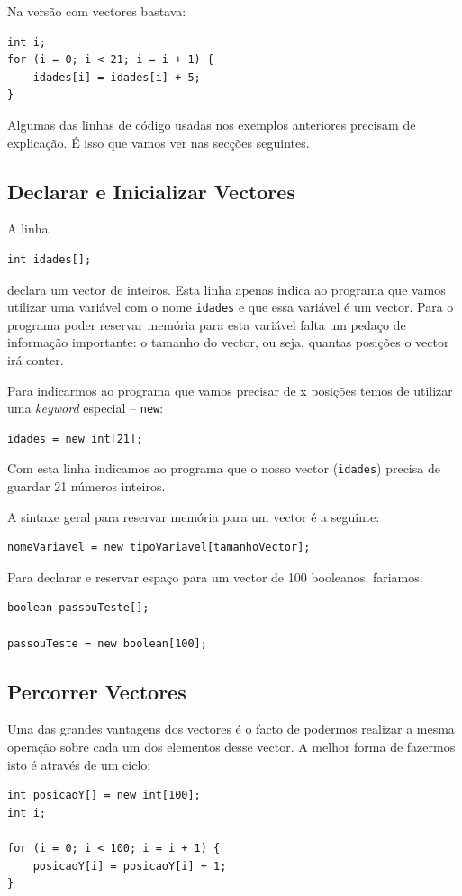 Na versão com vectores bastava:
\begin{lstlisting}
int i;
for (i = 0; i < 21; i = i + 1) {
    idades[i] = idades[i] + 5;
}
\end{lstlisting}

Algumas das linhas de código usadas nos exemplos anteriores precisam de explicação. É isso que vamos ver nas secções seguintes.

\subsection{Declarar e Inicializar Vectores}
A linha
\begin{lstlisting}
int idades[];
\end{lstlisting}
declara um vector de inteiros. Esta linha apenas indica ao programa que vamos utilizar uma variável com o nome \texttt{idades} e que essa variável é um vector. Para o programa poder reservar memória para esta variável falta um pedaço de informação importante: o tamanho do vector, ou seja, quantas posições o vector irá conter.

Para indicarmos ao programa que vamos precisar de x posições temos de utilizar uma \emph{keyword} especial -- \texttt{new}:
\begin{lstlisting}
idades = new int[21]; 
\end{lstlisting}
Com esta linha indicamos ao programa que o nosso vector (\texttt{idades}) precisa de guardar 21 números inteiros.

A sintaxe geral para reservar memória para um vector é a seguinte:
\begin{lstlisting}
nomeVariavel = new tipoVariavel[tamanhoVector];
\end{lstlisting}

Para declarar e reservar espaço para um vector de 100 booleanos, fariamos:
\begin{lstlisting}
boolean passouTeste[];

passouTeste = new boolean[100];
\end{lstlisting}

\subsection{Percorrer Vectores}
Uma das grandes vantagens dos vectores é o facto de podermos realizar a mesma operação sobre cada um dos elementos desse vector. A melhor forma de fazermos isto é através de um ciclo:
\begin{lstlisting}
int posicaoY[] = new int[100];
int i;

for (i = 0; i < 100; i = i + 1) {
    posicaoY[i] = posicaoY[i] + 1;
}
\end{lstlisting}

